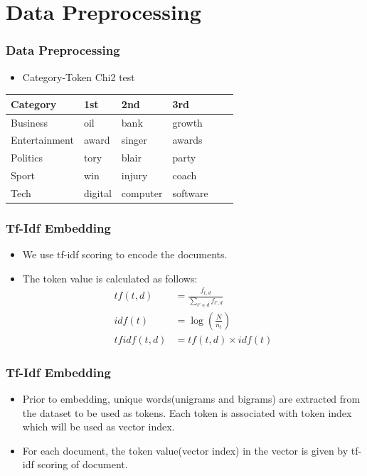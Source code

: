 \documentclass[
  10pt %
  16:9, %
]{beamer}
\begin{document}
\section{Data Preprocessing}
\frame
{
  \frametitle{Data Preprocessing}
  \begin{itemize}
  \item Category-Token Chi2 test
  \end{itemize}
  \begin{table}
  \centering
  \begin{tabular}{@{}llllll@{}}
    \toprule
    Category       & 1st       & 2nd      & 3rd      \\ \midrule
    Business       & oil       & bank     & growth   \\
    Entertainment  & award     & singer   & awards   \\
    Politics       & tory      & blair    & party    \\
    Sport          & win       & injury   & coach    \\
    Tech           & digital   & computer & software \\
    \bottomrule
  \end{tabular}
  \end{table}
}

\begin{frame}
  \frametitle{Tf-Idf Embedding}
  \begin{itemize}
  \item We use tf-idf scoring to encode the documents.
  \item The token value is calculated as follows:
  \begin{align}
    tf(t,d) &= \frac{f_{t,d}}{\sum_{t' \in d} f_{t',d}} \\
    idf(t) &= \log\left(\frac{N}{n_t}\right) \\
    tfidf(t,d) &= tf(t,d) \times idf(t)
  \end{align}
  \end{itemize}
\end{frame}

\begin{frame}
  \frametitle{Tf-Idf Embedding}
  \begin{itemize}
  \item Prior to embedding, unique words(unigrams and bigrams) are extracted from the dataset to be used as tokens. Each token is associated with token index which will be used as vector index.
    \item For each document, the token value(vector index) in the vector is given by tf-idf scoring of document.
  \end{itemize}
\end{frame}
\end{document}
